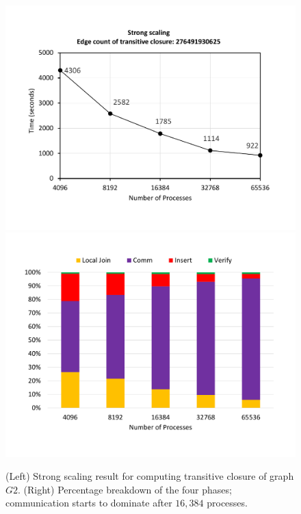\begin{figure}[t]
	{\includegraphics[width=.50\textwidth,  trim={0cm 0cm 0cm 0cm, 
			clip}]{results/TC_2_final.pdf}}\hfill%
	{\includegraphics[width=.50\textwidth,  trim={0cm 0cm 0cm 0cm,
			clip}]{results/TC_2_break_down_final.pdf}}\hfill%
	\centering
	\caption{(Left) Strong scaling result for computing transitive closure of graph $G2$. (Right) Percentage breakdown of the four phases; communication starts to dominate after $16,384$ processes.}
	\label{fig:tc_big}
\end{figure}


